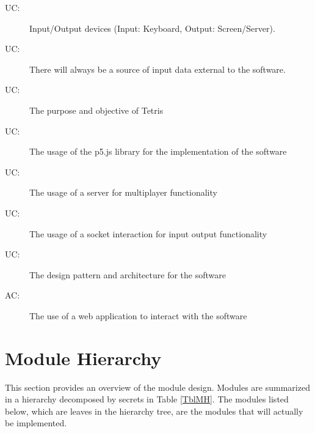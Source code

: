 \documentclass[12pt, titlepage]{article}
\newcounter{acnum}
\newcommand{\actheacnum}{AC\theacnum}
\newcounter{ucnum}
\newcommand{\uctheucnum}{UC\theucnum}
\begin{document}
\begin{description}
\item[ \uctheucnum \label{ucIO}:] Input/Output devices
  (Input: Keyboard, Output: Screen/Server).
\item[ \uctheucnum \label{ucInput}:] There will always be
  a source of input data external to the software.
\item[ \uctheucnum \label{ucTetris}:] The purpose and objective of Tetris
\item[ \uctheucnum \label{ucP5JS}:] The usage of the p5.js library for the implementation of the software
\item[ \uctheucnum \label{ucServer}:] The usage of a server for multiplayer functionality
\item[ \uctheucnum \label{ucSocket}:] The usage of a socket interaction for input output functionality  
\item[ \uctheucnum \label{ucDesign}:] The design pattern and architecture for the software 
\item[ \actheacnum \label{ucWebApp}:] The use of a web application to interact with the software
\end{description}

\section{Module Hierarchy} \label{SecMH}

This section provides an overview of the module design. Modules are summarized
in a hierarchy decomposed by secrets in Table \ref{TblMH}. The modules listed
below, which are leaves in the hierarchy tree, are the modules that will
actually be implemented.
\end{document}
